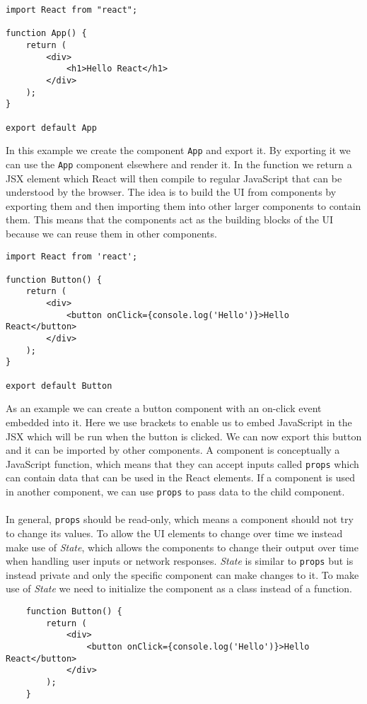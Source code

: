 \begin{lstlisting}
import React from "react";

function App() {
    return (
        <div>
            <h1>Hello React</h1>
        </div>
    );
}

export default App
\end{lstlisting}
In this example we create the component \texttt{App} and export it.
By exporting it we can use the \texttt{App} component elsewhere and render it.
In the function we return a JSX element which React will then compile to regular JavaScript that can be understood by the browser.
The idea is to build the UI from components by exporting them and then importing them into other larger components to contain them.
This means that the components act as the building blocks of the UI because we can reuse them in other components.
\begin{lstlisting}
import React from 'react';

function Button() {
    return (
        <div>
            <button onClick={console.log('Hello')}>Hello React</button>
        </div>
    );
}

export default Button
\end{lstlisting}
As an example we can create a button component with an on-click event embedded into it.
Here we use brackets to enable us to embed JavaScript in the JSX which will be run when the button is clicked.
We can now export this button and it can be imported by other components.
A component is conceptually a JavaScript function, which means that they can accept inputs called \texttt{props} which can contain data that can be used in the React elements.
If a component is used in another component, we can use \texttt{props} to pass data to the child component.
\\\\
In general, \texttt{props} should be read-only, which means a component should not try to change its values.
To allow the UI elements to change over time we instead make use of \textit{State}, which allows the components to change their output over time when handling user inputs or network responses.
\textit{State} is similar to \texttt{props} but is instead private and only the specific component can make changes to it.
To make use of \textit{State} we need to initialize the component as a class instead of a function.
\begin{lstlisting}
    function Button() {
        return (
            <div>
                <button onClick={console.log('Hello')}>Hello React</button>
            </div>
        );
    }
\end{lstlisting}

